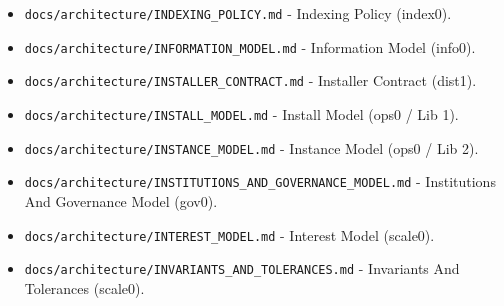 \documentclass[9pt,a4paper,openany]{book}
\begin{document}
\begin{itemize}
\item \texttt{docs/\allowbreak{}architecture/\allowbreak{}INDEXING\_\allowbreak{}POLICY.\allowbreak{}md} -\allowbreak{} Indexing Policy (index0).\allowbreak{}
\end{itemize}

\begin{itemize}
\item \texttt{docs/\allowbreak{}architecture/\allowbreak{}INFORMATION\_\allowbreak{}MODEL.\allowbreak{}md} -\allowbreak{} Information Model (info0).\allowbreak{}
\end{itemize}

\begin{itemize}
\item \texttt{docs/\allowbreak{}architecture/\allowbreak{}INSTALLER\_\allowbreak{}CONTRACT.\allowbreak{}md} -\allowbreak{} Installer Contract (dist1).\allowbreak{}
\end{itemize}

\begin{itemize}
\item \texttt{docs/\allowbreak{}architecture/\allowbreak{}INSTALL\_\allowbreak{}MODEL.\allowbreak{}md} -\allowbreak{} Install Model (ops0 /\allowbreak{} Lib 1).\allowbreak{}
\end{itemize}

\begin{itemize}
\item \texttt{docs/\allowbreak{}architecture/\allowbreak{}INSTANCE\_\allowbreak{}MODEL.\allowbreak{}md} -\allowbreak{} Instance Model (ops0 /\allowbreak{} Lib 2).\allowbreak{}
\end{itemize}

\begin{itemize}
\item \texttt{docs/\allowbreak{}architecture/\allowbreak{}INSTITUTIONS\_\allowbreak{}AND\_\allowbreak{}GOVERNANCE\_\allowbreak{}MODEL.\allowbreak{}md} -\allowbreak{} Institutions And Governance Model (gov0).\allowbreak{}
\end{itemize}

\begin{itemize}
\item \texttt{docs/\allowbreak{}architecture/\allowbreak{}INTEREST\_\allowbreak{}MODEL.\allowbreak{}md} -\allowbreak{} Interest Model (scale0).\allowbreak{}
\end{itemize}

\begin{itemize}
\item \texttt{docs/\allowbreak{}architecture/\allowbreak{}INVARIANTS\_\allowbreak{}AND\_\allowbreak{}TOLERANCES.\allowbreak{}md} -\allowbreak{} Invariants And Tolerances (scale0).\allowbreak{}
\end{itemize}
\end{document}
